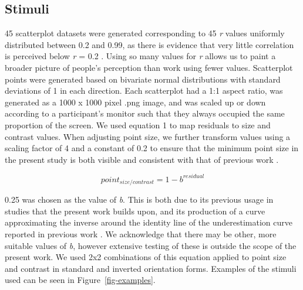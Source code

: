 \documentclass[manuscript, anonymous, screen]{acmart}
\begin{document}
\hypertarget{sec-scatter-gen}{%
\subsection{Stimuli}\label{sec-scatter-gen}}

45 scatterplot datasets were generated corresponding to 45 \emph{r}
values uniformly distributed between 0.2 and 0.99, as there is evidence
that very little correlation is perceived below \emph{r} = 0.2
\citep{strahan_1978, bobko_1979, cleveland_1982}. Using so many values
for \emph{r} allows us to paint a broader picture of people's perception
than work using fewer values. Scatterplot points were generated based on
bivariate normal distributions with standard deviations of 1 in each
direction. Each scatterplot had a 1:1 aspect ratio, was generated as a
1000 x 1000 pixel .png image, and was scaled up or down according to a
participant's monitor such that they always occupied the same proportion
of the screen. We used equation 1 to map residuals to size and contrast
values. When adjusting point size, we further transform values using a
scaling factor of 4 and a constant of 0.2 to ensure that the minimum
point size in the present study is both visible and consistent with that
of previous work \citep{strain_2023, strain_2023b}.

\begin{equation}
  point_{size/contrast} = 1 - b^{residual}
\end{equation}

0.25 was chosen as the value of \emph{b}. This is both due to its
previous usage in studies that the present work builds upon, and its
production of a curve approximating the inverse around the identity line
of the underestimation curve reported in previous work
\citep{rensink_2017, strain_2023, strain_2023b}. We acknowledge that
there may be other, more suitable values of \emph{b}, however extensive
testing of these is outside the scope of the present work. We used 2x2
combinations of this equation applied to point size and contrast in
standard and inverted orientation forms. Examples of the stimuli used
can be seen in Figure~\ref{fig-examples}.
\end{document}
